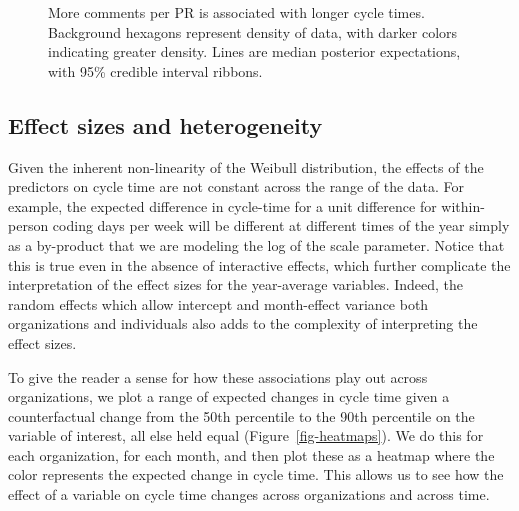 \documentclass[
]{article}
\begin{document}
\begin{figure}[htbp]


\caption[More comments per PR is associated with longer cycle
times]{\label{fig-comments}More comments per PR is associated with
longer cycle times. Background hexagons represent density of data, with
darker colors indicating greater density. Lines are median posterior
expectations, with 95\% credible interval ribbons.}

\end{figure}%

\subsection{Effect sizes and
heterogeneity}\label{effect-sizes-and-heterogeneity}

Given the inherent non-linearity of the Weibull distribution, the
effects of the predictors on cycle time are not constant across the
range of the data. For example, the expected difference in cycle-time
for a unit difference for within-person coding days per week will be
different at different times of the year simply as a by-product that we
are modeling the log of the scale parameter. Notice that this is true
even in the absence of interactive effects, which further complicate the
interpretation of the effect sizes for the year-average variables.
Indeed, the random effects which allow intercept and month-effect
variance both organizations and individuals also adds to the complexity
of interpreting the effect sizes.

To give the reader a sense for how these associations play out across
organizations, we plot a range of expected changes in cycle time given a
counterfactual change from the 50th percentile to the 90th percentile on
the variable of interest, all else held equal
(Figure~\ref{fig-heatmaps}). We do this for each organization, for each
month, and then plot these as a heatmap where the color represents the
expected change in cycle time. This allows us to see how the effect of a
variable on cycle time changes across organizations and across time.
\end{document}
